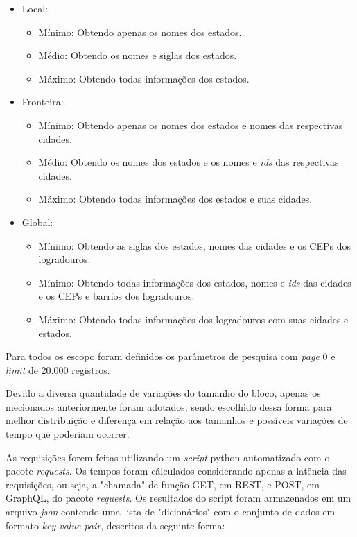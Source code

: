\documentclass[conference]{IEEEtran}
\begin{document}
\begin{itemize}
    \item Local:
        \begin{itemize}
            \item Mínimo: Obtendo apenas os nomes dos estados.
            \item Médio: Obtendo os nomes e siglas dos estados.
            \item Máximo: Obtendo todas informações dos estados.
        \end{itemize}
    \item Fronteira:
        \begin{itemize}
            \item Mínimo: Obtendo apenas os nomes dos estados e nomes das respectivas cidades.
            \item Médio: Obtendo os nomes dos estados e os nomes e \textit{ids} das respectivas cidades.
            \item Máximo: Obtendo todas informações dos estados e suas cidades.
        \end{itemize}
    \item Global:
        \begin{itemize}
            \item Mínimo: Obtendo as siglas dos estados, nomes das cidades e os CEPs dos logradouros.
            \item Mínimo: Obtendo todas informações dos estados, nomes e \textit{ids} das cidades e os CEPs e barrios dos logradouros.
            \item Máximo: Obtendo todas informações dos logradouros com suas cidades e estados.
        \end{itemize}
\end{itemize}

Para todos os escopo foram definidos os parâmetros de pesquisa com \textit{page} 0 e \textit{limit} de 20.000 registros.

Devido a diversa quantidade de variações do tamanho do bloco, apenas os mecionados anteriormente foram adotados, sendo escolhido dessa forma para melhor distribuição e diferença em relação aos tamanhos e possíveis variações de tempo que poderiam ocorrer.

As requisições forem feitas utilizando um \textit{script} python automatizado com o pacote \textit{requests}. Os tempos foram cálculados considerando apenas a latência das requisições, ou seja, a "chamada" de função GET, em REST, e POST, em GraphQL, do pacote \textit{requests}. Os resultados do script foram armazenados em um arquivo \textit{json} contendo uma lista de "dicionários" com o conjunto de dados em formato \textit{key-value pair}, descritos da seguinte forma:
\end{document}
